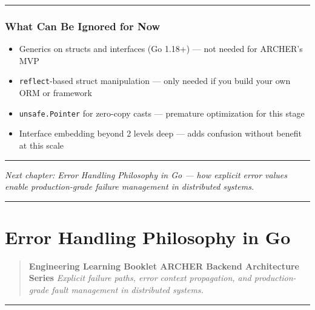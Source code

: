 \documentclass[11pt,openany]{book}
\providecommand{\tightlist}{%
  \setlength{\itemsep}{0pt}\setlength{\parskip}{0pt}}
\begin{document}
\begin{center}\rule{0.5\linewidth}{0.5pt}\end{center}

\hypertarget{what-can-be-ignored-for-now-2}{%
\subsection{What Can Be Ignored for
Now}\label{what-can-be-ignored-for-now-2}}

\begin{itemize}
\tightlist
\item
  Generics on structs and interfaces (Go 1.18+) --- not needed for
  ARCHER's MVP
\item
  \texttt{reflect}-based struct manipulation --- only needed if you
  build your own ORM or framework
\item
  \texttt{unsafe.Pointer} for zero-copy casts --- premature optimization
  for this stage
\item
  Interface embedding beyond 2 levels deep --- adds confusion without
  benefit at this scale
\end{itemize}

\begin{center}\rule{0.5\linewidth}{0.5pt}\end{center}

\emph{Next chapter: Error Handling Philosophy in Go --- how explicit
error values enable production-grade failure management in distributed
systems.}

\begin{center}\rule{0.5\linewidth}{0.5pt}\end{center}

\hypertarget{chapter-04-error-handling-philosophy-in-go}{%
\chapter{Error Handling Philosophy in
Go}\label{chapter-04-error-handling-philosophy-in-go}}

\begin{quote}
\textbf{Engineering Learning Booklet \textbar{} ARCHER Backend
Architecture Series} \emph{Explicit failure paths, error context
propagation, and production-grade fault management in distributed
systems.}
\end{quote}

\begin{center}\rule{0.5\linewidth}{0.5pt}\end{center}
\end{document}
